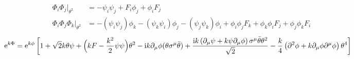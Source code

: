 \documentclass[CheatSheet]{subfiles}
\begin{document}
\begin{align}
 \Phi_i\Phi_j\Big|_{\theta^2}&=-\psi_i\psi_j+F_i\phi_j+\phi_iF_j
\\
\Phi_i\Phi_j\Phi_k\Big|_{\theta^2}&=
-(\psi_i\psi_j)\phi_k-(\psi_k\psi_i)\phi_j-(\psi_j\psi_k)\phi_i+\phi_i\phi_jF_k+\phi_k\phi_iF_j+\phi_j\phi_kF_i
\end{align}
\begin{equation}
 \begin{split}
\mathop{}\!\mathrm{e}^{k\Phi} &=
\mathop{}\!\mathrm{e}^{k\phi}\left[1+\sqrt{2} k \theta \psi+\Bigl(kF-\frac{k^2}{2}\psi\psi\Bigr) \theta^2-\mathrm{i} k \partial_{\mu}\phi (\theta \sigma^{\mu}\bar\theta)
+\frac{\mathrm{i} k \left(\partial_{\mu}\psi+k\psi\partial_{\mu}\phi\right)\sigma^{\mu}\bar\theta \theta^2}{\sqrt{2}}-\frac{k}{4} \left(\partial^2\phi+k \partial_{\mu}\phi\partial^{\mu}\phi\right) \theta^4\right]
\end{split}
\end{equation}
\end{document}
